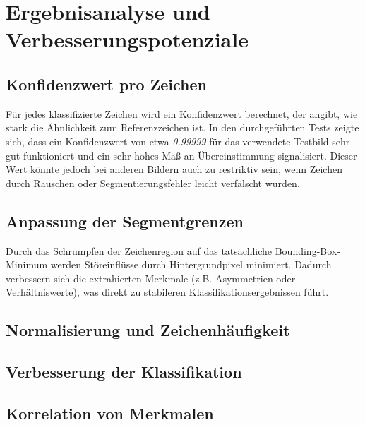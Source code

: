 \section{Ergebnisanalyse und Verbesserungspotenziale}

\subsection{Konfidenzwert pro Zeichen}


Für jedes klassifizierte Zeichen wird ein Konfidenzwert berechnet, der angibt, wie stark die Ähnlichkeit zum Referenzzeichen ist. In den durchgeführten Tests zeigte sich, dass ein Konfidenzwert von etwa \textit{0.99999} für das verwendete Testbild sehr gut funktioniert und ein sehr hohes Maß an Übereinstimmung signalisiert. Dieser Wert könnte jedoch bei anderen Bildern auch zu restriktiv sein, wenn Zeichen durch Rauschen oder Segmentierungsfehler leicht verfälscht wurden.


\subsection{Anpassung der Segmentgrenzen}


Durch das Schrumpfen der Zeichenregion auf das tatsächliche Bounding-Box-Minimum werden Störeinflüsse durch Hintergrundpixel minimiert. Dadurch verbessern sich die extrahierten Merkmale (z.B. Asymmetrien oder Verhältniswerte), was direkt zu stabileren Klassifikationsergebnissen führt.


\subsection{Normalisierung und Zeichenhäufigkeit}



\subsection{Verbesserung der Klassifikation}



\subsection{Korrelation von Merkmalen}



